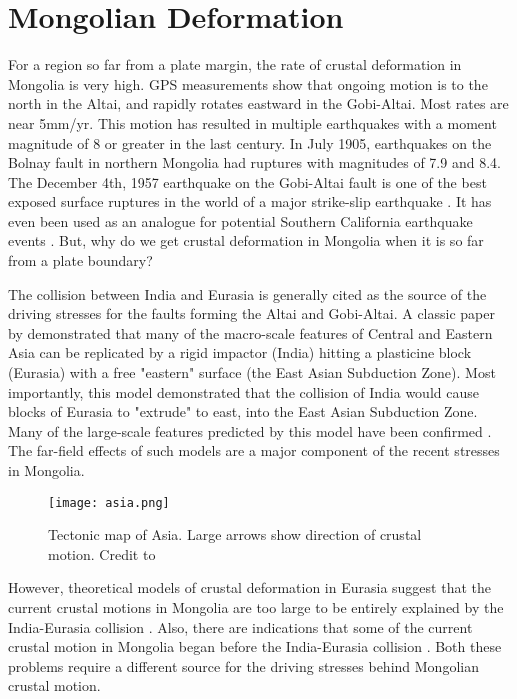 \documentclass[10pt,a4paper]{article}
\begin{document}
\section*{Mongolian Deformation}
	For a region so far from a plate margin, the rate of crustal deformation in Mongolia is very high. GPS measurements show that ongoing motion is to the north in the Altai, and rapidly rotates eastward in the Gobi-Altai\citep{Calais2003}. Most rates are near 5mm/yr. This motion has resulted in multiple earthquakes with a moment magnitude of 8 or greater in the last century. In July 1905, earthquakes on the Bolnay fault in northern Mongolia had ruptures with magnitudes of 7.9 and 8.4. The December 4th, 1957 earthquake on the Gobi-Altai fault is one of the best exposed surface ruptures in the world of a major strike-slip earthquake \citep{Kurushin1998} \citep{Okal1976a} \citep{Pollitz2003}. It has even been used as an analogue for potential Southern California earthquake events \citep{Bayarsayhan1996}. But, why do we get crustal deformation in Mongolia when it is so far from a plate boundary?

	The collision between India and Eurasia is generally cited as the source of the driving stresses for the faults forming the Altai and Gobi-Altai. A classic paper by \citep{Tapponnier1982} demonstrated that many of the macro-scale features of Central and Eastern Asia can be replicated by a rigid impactor (India) hitting a plasticine block (Eurasia) with a free "eastern" surface (the East Asian Subduction Zone). Most importantly, this model demonstrated that the collision of India would cause blocks of Eurasia to "extrude" to east, into the East Asian Subduction Zone.  Many of the large-scale features predicted by this model have been confirmed \citep{Schellart2005}\cite{Yin2010}. The far-field effects of such models are a major component of the recent stresses in Mongolia. 

\begin{figure}[h!]
	\centering
	\texttt{[image: asia.png]}
	\caption{Tectonic map of Asia. Large arrows show direction of crustal motion. Credit to \citep{Tapponnier1982}}
\end{figure}

	However, theoretical models of crustal deformation in Eurasia suggest that the current crustal motions in Mongolia are too large to be entirely explained by the India-Eurasia collision \citep{Calais2002a}. Also, there are indications that some of the current crustal motion in Mongolia began before the India-Eurasia collision \citep{Schellart2005}. Both these problems require a different source for the driving stresses behind Mongolian crustal motion. 
	
\end{document}
